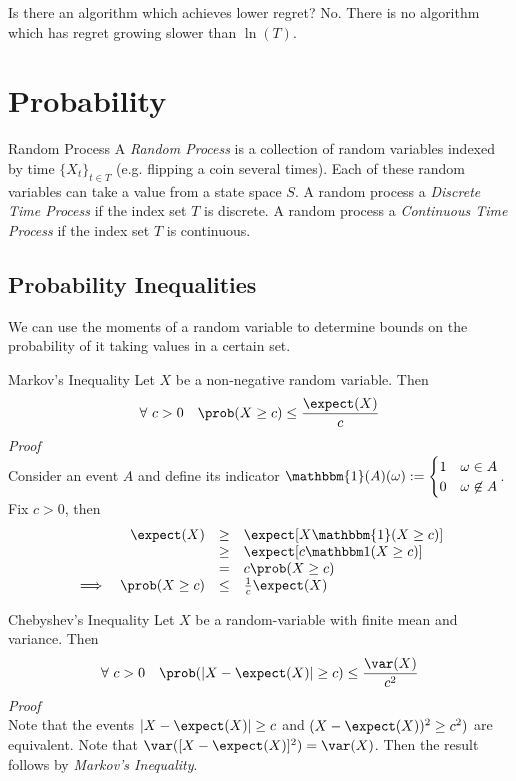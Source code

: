 \documentclass[11pt,a4paper]{article}
\begin{document}
\begin{remark}{Is there an algorithm which achieves lower regret?}
  No. There is no algorithm which has regret growing slower than $\ln(T)$.
\end{remark}

\section{Probability}

\begin{definition}{Random Process}
  A \textit{Random Process} is a collection of random variables indexed by time $\{X_t\}_{t\in T}$ (e.g. flipping a coin several times). Each of these random variables can take a value from a state space $S$. A random process a \textit{Discrete Time Process} if the index set $T$ is discrete. A random process a \textit{Continuous Time Process} if the index set $T$ is continuous.
\end{definition}

\subsection{Probability Inequalities}

\begin{remark}{We can use the moments of a random variable to determine bounds on the probability of it taking values in a certain set.}
\end{remark}

\begin{theorem}{Markov's Inequality}
  Let $X$ be a non-negative random variable. Then
  \[ \forall\ c>0\quad\prob(X\geq c)\leq\frac{\expect(X)}c \]
  \textit{Proof}\\
  Consider an event $A$ and define its indicator $\mathbbm{1}(A)(\omega):=\begin{cases}1&\omega\in A\\0&\omega\not\in A\end{cases}$. Fix $c>0$, then
  \[\begin{array}{rrcl}
    &\expect(X)&\geq&\expect[X\mathbbm{1}(X\geq c)]\\
    &&\geq&\expect[c\mathbbm1(X\geq c)]\\
    &&=&c\prob(X\geq c)\\
    \implies&\prob(X\geq c)&\leq&\frac1c\expect(X)
  \end{array}\]
\end{theorem}

\begin{theorem}{Chebyshev's Inequality}
  Let $X$ be a random-variable with finite mean and variance. Then
  \[ \forall\ c>0\quad\prob(|X-\expect(X)|\geq c)\leq\frac{\var(X)}{c^2}\]
  \textit{Proof}\\
  Note that the events $|X-\expect(X)|\geq c$ and $(X-\expect(X))^2\ge c^2)$ are equivalent. Note that $\var([X-\expect(X)]^2)=\var(X)$. Then the result follows by \textit{Markov's Inequality}.
\end{theorem}
\end{document}
